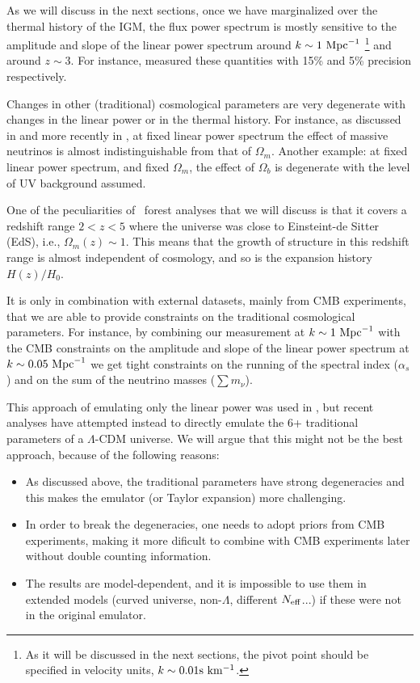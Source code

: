 As we will discuss in the next sections, once we have marginalized over 
the thermal history of the IGM, the flux power spectrum is mostly 
sensitive to the amplitude and slope of the linear power spectrum around 
$k \sim 1 \ \text{Mpc}^{-1}$ 
\footnote{As it will be discussed in the next sections, the pivot point 
should be specified in velocity units, $k \sim 0.01 {\rm s~km^{-1}}$.} 
and around $z \sim 3$.
For instance, \cite{McDonald2005a} measured these quantities with 15\% and 
5\% precision respectively.

Changes in other (traditional) cosmological parameters are very degenerate 
with changes in the linear power or in the thermal history. 
For instance, as discussed in \cite{Viel2010} and more recently in 
\cite{Pedersen2018}, at fixed linear power spectrum the effect of massive 
neutrinos is almost indistinguishable from that of $\Omega_m$. 
Another example: at fixed linear power spectrum, and fixed $\Omega_m$, the 
effect of $\Omega_b$ is degenerate with the level of UV background assumed.

One of the peculiarities of \lya\ forest analyses that we will discuss is 
that it covers a redshift range $2 < z < 5$ where the universe was close 
to Einsteint-de Sitter (EdS), i.e., $\Omega_m(z) \sim 1$. 
This means that the growth of structure in this redshift range is almost  
independent of cosmology, and so is the expansion history $H(z)/H_0$.

It is only in combination with external datasets, mainly from CMB experiments,
that we are able to provide constraints on the traditional cosmological 
parameters. 
For instance, by combining our measurement at $k \sim 1 \ \text{Mpc}^{-1}$ with the CMB 
constraints on the amplitude and slope of the linear power spectrum at 
$k \sim 0.05 \ \text{Mpc}^{-1}$ we get tight constraints on the running of the spectral
index ($\alpha_s$) and on the sum of the neutrino masses ($\sum m_\nu$). 

This approach of emulating only the linear power was used in 
\cite{McDonald2005a}, but recent analyses 
\cite{Palanque-Delabrouille2015,Yeche2017} have attempted instead to 
directly emulate the 6+ traditional parameters of a $\Lambda$-CDM universe. 
We will argue that this might not be the best approach, because of the
following reasons:
\begin{itemize}
 \item As discussed above, the traditional parameters have strong degeneracies
  and this makes the emulator (or Taylor expansion) more challenging. 
 \item In order to break the degeneracies, one needs to adopt priors from 
  CMB experiments, making it more dificult to combine with CMB experiments 
  later without double counting information.
 \item The results are model-dependent, and it is impossible to use them in 
  extended models (curved universe, non-$\Lambda$, different $N_{\rm eff}$...)
  if these were not in the original emulator.
\end{itemize}


